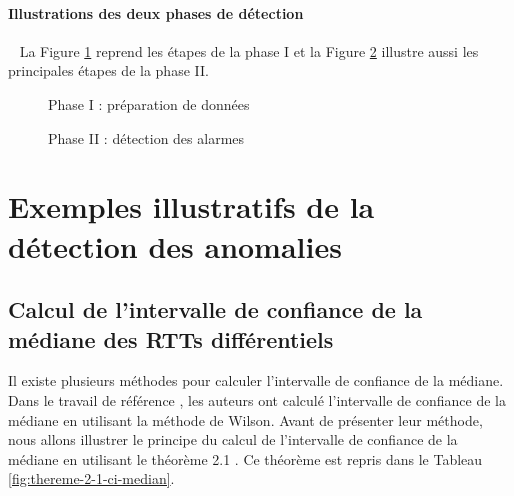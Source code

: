 \paragraph{ Illustrations des deux phases de détection}~
La Figure  \ref{fig:step-preparing-data} reprend les étapes de la phase I et
la Figure \ref{fig:step-detection-anomalies} illustre aussi les principales étapes  de la phase II.
\newpage

\begin{figure}[H]
	\centering
	\captionsetup{justification=centering}
	\resizebox{!}{\textheight}{
		
	}
	\caption{Phase I : préparation de données }
	\label{fig:step-preparing-data}
\end{figure}

\begin{figure}[H]
	\centering
	\captionsetup{justification=centering}
	\resizebox{\textwidth}{\textheight}{
		
	}
	\caption{Phase II : détection des alarmes }
	\label{fig:step-detection-anomalies}
\end{figure}


\section{Exemples illustratifs  de la détection des anomalies}


\subsection{Calcul de l'intervalle de confiance de la médiane des RTTs différentiels} \label{conf-inter-section-exemple}

Il existe plusieurs méthodes pour calculer l'intervalle de confiance de la médiane. Dans le travail de référence \cite{DBLP:journals/corr/FontugneAPB16}, les auteurs ont calculé l'intervalle de confiance de la médiane en utilisant la méthode de Wilson. Avant de présenter leur méthode, nous allons illustrer le principe du calcul de l'intervalle de confiance de la médiane en utilisant le théorème  2.1  \cite{leboudec2010performance}. Ce théorème est repris dans le Tableau \ref{fig:thereme-2-1-ci-median}.

